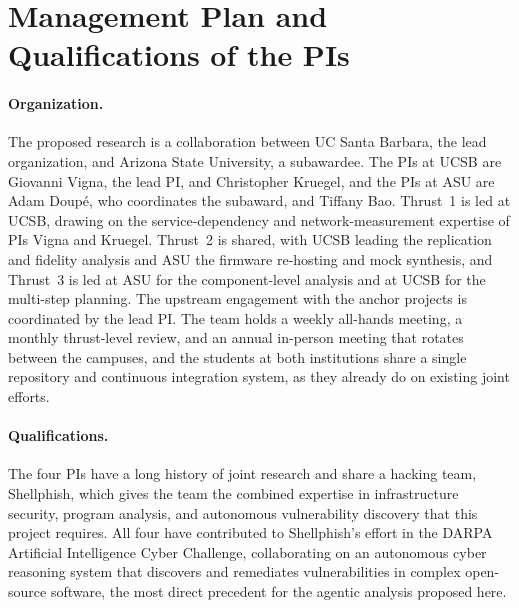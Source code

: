 \section{Management Plan and Qualifications of the PIs}
\label{sec:pis}

\paragraph{Organization.}
The proposed research is a collaboration between UC Santa Barbara, the lead
organization, and Arizona State University, a subawardee. The PIs at UCSB are Giovanni Vigna, the lead PI, and Christopher
Kruegel, and the PIs at ASU are Adam Doup\'e, who coordinates the subaward,
and Tiffany Bao. Thrust~1 is led at UCSB, drawing on the service-dependency
and network-measurement expertise of PIs Vigna and Kruegel. Thrust~2 is
shared, with UCSB leading the replication and fidelity analysis and ASU the
firmware re-hosting and mock synthesis, and Thrust~3 is led at ASU for the
component-level analysis and at UCSB for the multi-step planning. The
upstream engagement with the anchor projects is coordinated by the lead PI.
The team holds a weekly all-hands meeting, a monthly thrust-level review, and
an annual in-person meeting that rotates between the campuses, and the
students at both institutions share a single repository and continuous
integration system, as they already do on existing joint efforts.

\paragraph{Qualifications.}
The four PIs have a long history of joint research and share a hacking team,
Shellphish, which gives the team the combined expertise in infrastructure
security, program analysis, and autonomous vulnerability discovery that this
project requires. All four have contributed to Shellphish's effort in the
DARPA Artificial Intelligence Cyber Challenge, collaborating on an autonomous
cyber reasoning system that discovers and remediates vulnerabilities in
complex open-source software, the most direct precedent for the agentic
analysis proposed here.

